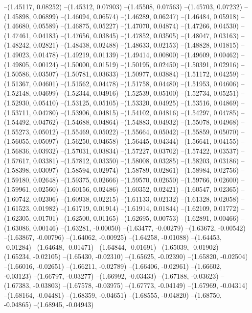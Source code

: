 --(1.45117, 0.08252)
--(1.45312, 0.07903)
--(1.45508, 0.07563)
--(1.45703, 0.07232)
--(1.45898, 0.06899)
--(1.46094, 0.06574)
--(1.46289, 0.06247)
--(1.46484, 0.05918)
--(1.46680, 0.05589)
--(1.46875, 0.05227)
--(1.47070, 0.04874)
--(1.47266, 0.04530)
--(1.47461, 0.04183)
--(1.47656, 0.03845)
--(1.47852, 0.03505)
--(1.48047, 0.03163)
--(1.48242, 0.02821)
--(1.48438, 0.02488)
--(1.48633, 0.02153)
--(1.48828, 0.01815)
--(1.49023, 0.01478)
--(1.49219, 0.01139)
--(1.49414, 0.00800)
--(1.49609, 0.00462)
--(1.49805, 0.00124)
--(1.50000, 0.01519)
--(1.50195, 0.02450)
--(1.50391, 0.02916)
--(1.50586, 0.03507)
--(1.50781, 0.03633)
--(1.50977, 0.03884)
--(1.51172, 0.04259)
--(1.51367, 0.04601)
--(1.51562, 0.04478)
--(1.51758, 0.04480)
--(1.51953, 0.04606)
--(1.52148, 0.04699)
--(1.52344, 0.04916)
--(1.52539, 0.05100)
--(1.52734, 0.05251)
--(1.52930, 0.05410)
--(1.53125, 0.05105)
--(1.53320, 0.04925)
--(1.53516, 0.04869)
--(1.53711, 0.04780)
--(1.53906, 0.04815)
--(1.54102, 0.04816)
--(1.54297, 0.04785)
--(1.54492, 0.04762)
--(1.54688, 0.04864)
--(1.54883, 0.04932)
--(1.55078, 0.04968)
--(1.55273, 0.05012)
--(1.55469, 0.05022)
--(1.55664, 0.05042)
--(1.55859, 0.05070)
--(1.56055, 0.05097)
--(1.56250, 0.04658)
--(1.56445, 0.04344)
--(1.56641, 0.04155)
--(1.56836, 0.03932)
--(1.57031, 0.03834)
--(1.57227, 0.03702)
--(1.57422, 0.03537)
--(1.57617, 0.03381)
--(1.57812, 0.03350)
--(1.58008, 0.03285)
--(1.58203, 0.03186)
--(1.58398, 0.03097)
--(1.58594, 0.02974)
--(1.58789, 0.02861)
--(1.58984, 0.02756)
--(1.59180, 0.02648)
--(1.59375, 0.02666)
--(1.59570, 0.02650)
--(1.59766, 0.02600)
--(1.59961, 0.02560)
--(1.60156, 0.02486)
--(1.60352, 0.02421)
--(1.60547, 0.02365)
--(1.60742, 0.02306)
--(1.60938, 0.02215)
--(1.61133, 0.02132)
--(1.61328, 0.02058)
--(1.61523, 0.01982)
--(1.61719, 0.01914)
--(1.61914, 0.01844)
--(1.62109, 0.01772)
--(1.62305, 0.01701)
--(1.62500, 0.01165)
--(1.62695, 0.00753)
--(1.62891, 0.00466)
--(1.63086, 0.00146)
--(1.63281, -0.00050)
--(1.63477, -0.00279)
--(1.63672, -0.00542)
--(1.63867, -0.00796)
--(1.64062, -0.00925)
--(1.64258, -0.01088)
--(1.64453, -0.01284)
--(1.64648, -0.01471)
--(1.64844, -0.01691)
--(1.65039, -0.01902)
--(1.65234, -0.02105)
--(1.65430, -0.02310)
--(1.65625, -0.02390)
--(1.65820, -0.02504)
--(1.66016, -0.02651)
--(1.66211, -0.02789)
--(1.66406, -0.02961)
--(1.66602, -0.03123)
--(1.66797, -0.03277)
--(1.66992, -0.03433)
--(1.67188, -0.03623)
--(1.67383, -0.03803)
--(1.67578, -0.03975)
--(1.67773, -0.04149)
--(1.67969, -0.04314)
--(1.68164, -0.04481)
--(1.68359, -0.04651)
--(1.68555, -0.04820)
--(1.68750, -0.04865)
--(1.68945, -0.04943)
